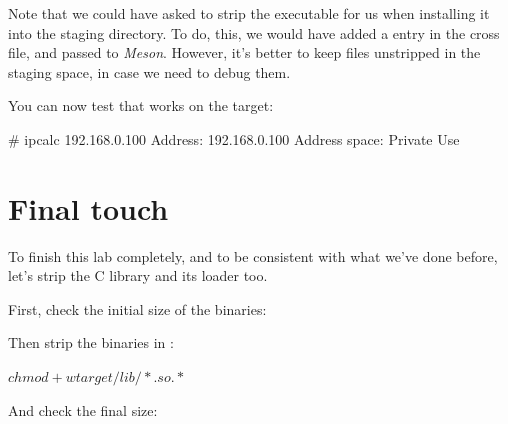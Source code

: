 Note that we could have asked  to strip the
executable for us when installing it into the staging directory.
To do, this, we would have added a  entry in the cross file,
and passed  to {\em Meson}. However, it's better to keep
files unstripped in the staging space, in case we need to debug them.

You can now test that  works on the target:

\begin{bashinput}
# ipcalc 192.168.0.100
Address:	192.168.0.100
Address space:	Private Use
\end{bashinput}

\section{Final touch}

To finish this lab completely, and to be consistent with what we've done before,
let's strip the C library and its loader too.

First, check the initial size of the binaries:

Then strip the binaries in :
\begin{bashinput}
$ chmod +w target/lib/*.so.*
$ %
\end{bashinput}

And check the final size:
